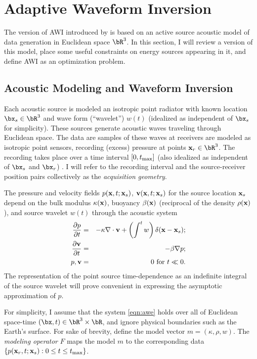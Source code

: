 \section{Adaptive Waveform Inversion}

The version of AWI introduced by \cite{Warner:16} is based on an
active source acoustic model of data generation in Euclidean space
$\bR^3$. In this section, I will review a version of this model, place
some useful constraints on energy sources appearing in it, and define
AWI as an optimization problem.

\subsection{Acoustic Modeling and Waveform Inversion}

Each acoustic source is modeled an isotropic point radiator
with known location $\bx_s\in \bR^3$ and wave form (``wavelet'')
$w(t)$ (idealized as independent of $\bx_s$ for simplicity). These
sources generate acoustic waves traveling through Euclidean space. The
data are samples of these waves at receivers are modeled as isotropic
point sensors, recording (excess) pressure at points
${\bf x}_r \in \bR^3$. The recording takes place over a time interval
$[0,t_{\rm max}]$ (also idealized as independent of $\bx_s$ and
$\bx_r$) . I will refer to the recording interval and the
source-receiver position pairs collectively as the {\em acquisition
  geometry}.

The pressure and velocity fields $p({\bf x},t;{\bf x}_s)$,
${\bf v}({\bf x},t;{\bf x}_s)$ for the source location ${\bf x}_s$
depend on the bulk modulus $\kappa({\bf x})$, buoyancy $\beta({\bf
  x})$ (reciprocal of the density $\rho({\bf x})$), and source wavelet $w(t)$ through the acoustic system
\begin{eqnarray}
  \label{eqn:awe}
 \frac{\partial p}{\partial t} & = &- \kappa \nabla \cdot {\bf v} +
                                    \left(\int^t w \right)
 \delta({\bf x}-{\bf x}_s); \nonumber \\
\frac{\partial {\bf v}}{\partial t} & = & - \beta \nabla p; \\ 
p, {\bf v} & = & 0 \mbox{ for }  t \ll 0.
\end{eqnarray}
The representation of the point source time-dependence as an
indefinite integral of the source wavelet will prove convenient
in expressing the asymptotic approximation of $p$.

For simplicity, I assume that the system \ref{eqn:awe} holds over all of Euclidean
space-time $(\bx,t) \in \bR^3 \times \bR$, and ignore physical
boundaries such as the Earth's surface.
For sake of brevity, define the model vector $m=(\kappa,\rho, w)$. The
{\em modeling operator} $F$ maps the model $m$ to the corresponding data $\{p({\bf x}_r,t;{\bf
  x}_s): 0 \le t \le t_{\rm max}\}$.


